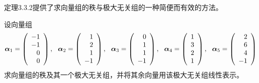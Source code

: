 \begin{frame}
定理3.3.2提供了求向量组的秩与极大无关组的一种简便而有效的方法。
\end{frame}

\begin{frame}
\begin{li}
  设向量组
  $$
  \boldsymbol{\alpha}_1=\left(
    \begin{array}{r}
      -1\\-1\\0\\0
    \end{array}
  \right),~~ \boldsymbol{\alpha}_2=\left(
    \begin{array}{r}
      1\\2\\1\\-1
    \end{array}
  \right),~~ \boldsymbol{\alpha}_3=\left(
    \begin{array}{r}
      0\\1\\1\\-1
    \end{array}
  \right),~~ \boldsymbol{\alpha}_4=\left(
    \begin{array}{r}
      1\\3\\2\\1
    \end{array}
  \right),~~ \boldsymbol{\alpha}_5=\left(
    \begin{array}{r}
      2\\6\\4\\-1
    \end{array}
  \right)
  $$
  求向量组的秩及其一个极大无关组，并将其余向量用该极大无关组线性表示。
\end{li}
\end{frame}

